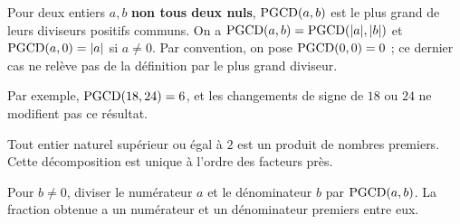 \begin{cours}
Pour deux entiers $a,b$ \textbf{non tous deux nuls}, $\operatorname{PGCD}(a,b)$ est le plus grand de leurs diviseurs positifs communs. On a $\operatorname{PGCD}(a,b)=\operatorname{PGCD}(|a|,|b|)$ et $\operatorname{PGCD}(a,0)=|a|$ si $a\ne0$. Par convention, on pose $\operatorname{PGCD}(0,0)=0$ ; ce dernier cas ne relève pas de la définition par le plus grand diviseur.
\end{cours}
Par exemple, $\operatorname{PGCD}(18,24)=6$, et les changements de signe de $18$ ou $24$ ne modifient pas ce résultat.
\begin{cours}
Tout entier naturel supérieur ou égal à $2$ est un produit de nombres premiers. Cette décomposition est unique à l'ordre des facteurs près.
\end{cours}
\begin{methode}
Pour $b\ne0$, diviser le numérateur $a$ et le dénominateur $b$ par $\operatorname{PGCD}(a,b)$. La fraction obtenue a un numérateur et un dénominateur premiers entre eux.
\end{methode}

